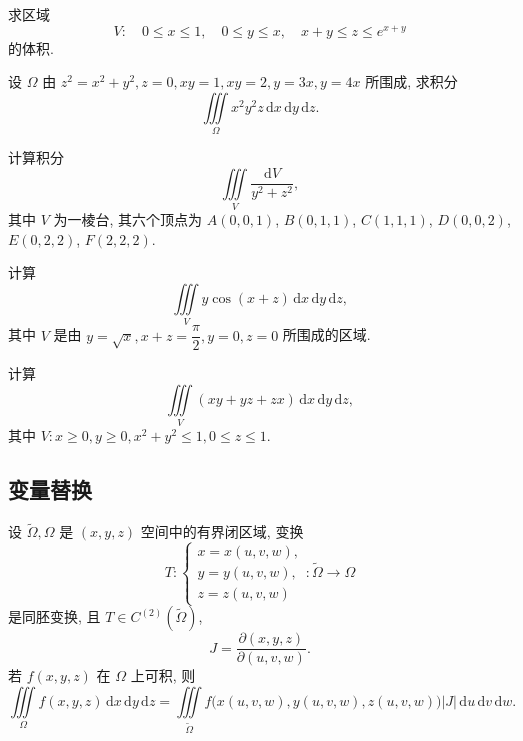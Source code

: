 \documentclass[../../数学分析培优讲义.tex]{subfiles}
\begin{document}
\begin{example}
求区域
\[
    V:\quad0\leq x\leq1,\quad0\leq y\leq x,\quad x+y\leq z\leq e^{x+y}
\]
的体积.
\end{example}
\exampleblank

\begin{example}
设 $\Omega$ 由 $z^2=x^2+y^2,z=0,xy=1,xy=2,y=3x,y=4x$ 所围成, 求积分
\[
    \iiint\limits_\Omega x^2y^2z\,\mathrm{d}x\,\mathrm{d}y\,\mathrm{d}z.
\]
\end{example}
\exampleblank

\begin{example}
计算积分
\[
    \iiint\limits_V\dfrac{\mathrm{d}V}{y^2+z^2},
\]
其中 $V$ 为一棱台, 其六个顶点为 $A(0,0,1)$, $B(0,1,1)$, $C(1,1,1)$, $D(0,0,2)$, $E(0,2,2)$, $F(2,2,2)$.
\end{example}
\exampleblank

\begin{example}
计算
\[
    \iiint\limits_V y\cos(x+z)\,\mathrm{d}x\,\mathrm{d}y\,\mathrm{d}z,
\]
其中 $V$ 是由 $y=\sqrt{x},x+z=\dfrac{\pi}{2},y=0,z=0$ 所围成的区域.
\end{example}
\exampleblank

\begin{example}
计算
\[
    \iiint\limits_V(xy+yz+zx)\,\mathrm{d}x\,\mathrm{d}y\,\mathrm{d}z,
\]
其中 $V:x\geq0,y\geq0,x^2+y^2\leq1,0\leq z\leq1$.
\end{example}
\exampleblank



\subsection{变量替换}

\begin{theorem}[\markstar]
设 $\widetilde\Omega,\Omega$ 是 $(x,y,z)$ 空间中的有界闭区域, 变换
\[
    T:\begin{cases}
        x=x(u,v,w),\\
        y=y(u,v,w),\\
        z=z(u,v,w)
    \end{cases}
    :\widetilde\Omega\to\Omega
\]
是同胚变换, 且 $T\in C^{(2)}(\widetilde\Omega)$,
\[
    J=\dfrac{\partial(x,y,z)}{\partial(u,v,w)}.
\]
若 $f(x,y,z)$ 在 $\Omega$ 上可积, 则
\[
    \iiint\limits_\Omega f(x,y,z)\,\mathrm{d}x\,\mathrm{d}y\,\mathrm{d}z
    =\iiint\limits_{\widetilde\Omega}
    f\bigl(x(u,v,w),y(u,v,w),z(u,v,w)\bigr)|J|\,\mathrm{d}u\,\mathrm{d}v\,\mathrm{d}w.
\]
\end{theorem}
\end{document}

